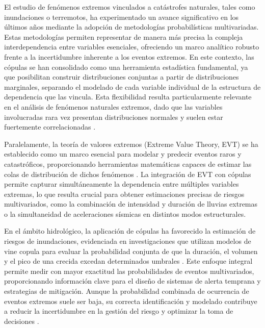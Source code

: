 \documentclass[12pt, a4paper]{article}
\begin{document}
El estudio de fenómenos extremos vinculados a catástrofes naturales, tales como inundaciones o terremotos, ha experimentado un avance significativo en los últimos años mediante la adopción de metodologías probabilísticas multivariadas. Estas metodologías permiten representar de manera más precisa la compleja interdependencia entre variables esenciales, ofreciendo un marco analítico robusto frente a la incertidumbre inherente a los eventos extremos. En este contexto, las cópulas se han consolidado como una herramienta estadística fundamental, ya que posibilitan construir distribuciones conjuntas a partir de distribuciones marginales, separando el modelado de cada variable individual de la estructura de dependencia que las vincula. Esta flexibilidad resulta particularmente relevante en el análisis de fenómenos naturales extremos, dado que las variables involucradas rara vez presentan distribuciones normales y suelen estar fuertemente correlacionadas \cite{DelfinerGutierrez2025,PerezGarcia2004}.

Paralelamente, la teoría de valores extremos (Extreme Value Theory, EVT) se ha establecido como un marco esencial para modelar y predecir eventos raros y catastróficos, proporcionando herramientas matemáticas capaces de estimar las colas de distribución de dichos fenómenos \cite{Siddiqui2022,DelfinerGutierrez2025}. La integración de EVT con cópulas permite capturar simultáneamente la dependencia entre múltiples variables extremas, lo que resulta crucial para obtener estimaciones precisas de riesgos multivariados, como la combinación de intensidad y duración de lluvias extremas o la simultaneidad de aceleraciones sísmicas en distintos modos estructurales.

En el ámbito hidrológico, la aplicación de cópulas ha favorecido la estimación de riesgos de inundaciones, evidenciada en investigaciones que utilizan modelos de vine copula para evaluar la probabilidad conjunta de que la duración, el volumen y el pico de una crecida excedan determinados umbrales \cite{DelfinerGutierrez2025}. Este enfoque integral permite medir con mayor exactitud las probabilidades de eventos multivariados, proporcionando información clave para el diseño de sistemas de alerta temprana y estrategias de mitigación. Aunque la probabilidad combinada de ocurrencia de eventos extremos suele ser baja, su correcta identificación y modelado contribuye a reducir la incertidumbre en la gestión del riesgo y optimizar la toma de decisiones \cite{PerezGarcia2004}.
\end{document}
